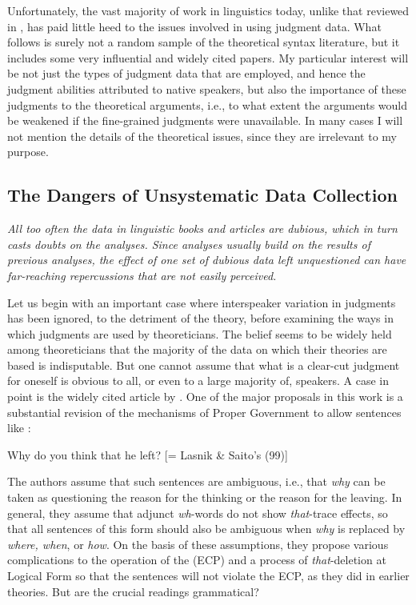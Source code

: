 Unfortunately, the vast majority of work in linguistics today, unlike that reviewed in , has paid little heed to the issues involved in using judgment data. What follows is surely not a random sample of the theoretical syntax literature, but it includes some very influential and widely cited papers. My particular interest will be not just the types of judgment data that are employed, and hence the judgment abilities attributed to native speakers, but also the importance of these judgments to the theoretical arguments, i.e., to what extent the arguments would be weakened if the fine-grained judgments were  unavailable.  In  many cases I will not mention the details of the theoretical issues, since they are irrelevant to my purpose.
 
\subsection{The Dangers of Unsystematic Data Collection} \label{sec:2.3.2}

\epigraph{\itshape All too often the data in linguistic books and articles are dubious, which in turn casts doubts on the analyses. Since analyses usually build on the results of previous analyses, the effect of one set of dubious data left unquestioned can have far-reaching repercussions that are not easily perceived.\\[-2\baselineskip]}{\citep{Greenbaum1977c}}

\noindent Let us begin with an important case where interspeaker variation in judgments has been ignored, to the detriment of the theory, before examining the ways in which judgments are used by theoreticians. The belief seems to be widely held among theoreticians that the majority of the data on which their theories are based is indisputable. But one cannot assume that what is a clear-cut judgment for oneself is obvious to all, or even to a large majority of, speakers. A case in point is the widely cited article by \citet{LasnikEtAl1984}. One of the major proposals in this work is a substantial revision of the mechanisms of Proper Government to allow sentences like :

\ea\label{ex:2:5}
Why do you think that he left?  [= Lasnik \& Saito's (99)]
\z

\noindent
The authors assume that such sentences are ambiguous, i.e., that \textit{why} can be taken as questioning the reason for the thinking or the reason for the leaving. In general, they assume that adjunct \textit{wh}-words do not show \textit{that}-trace effects, so that all sentences of this form should also be ambiguous when \textit{why} is replaced by \textit{where, when}, or \textit{how}. On the basis of these assumptions, they propose various complications to the operation of the  (ECP) and a process of \textit{that}-deletion at Logical Form so that the sentences will not violate the ECP, as they did in earlier theories. But are the crucial readings grammatical?

